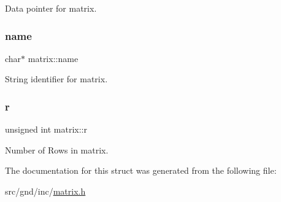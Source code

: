 Data pointer for matrix. 

\mbox{\label{structmatrix_a4b4ce5bf34789557b86c3c501790b72e}} 
\subsubsection{\texorpdfstring{name}{name}}
{\footnotesize\ttfamily char$\ast$ matrix\+::name}



String identifier for matrix. 

\mbox{\label{structmatrix_ac5217ab574fd3214f35f417a947b4bb1}} 
\subsubsection{\texorpdfstring{r}{r}}
{\footnotesize\ttfamily unsigned int matrix\+::r}



Number of Rows in matrix. 



The documentation for this struct was generated from the following file\+:\begin{DoxyCompactItemize}
\item 
src/gnd/inc/\hyperlink{matrix_8h}{matrix.\+h}\end{DoxyCompactItemize}
